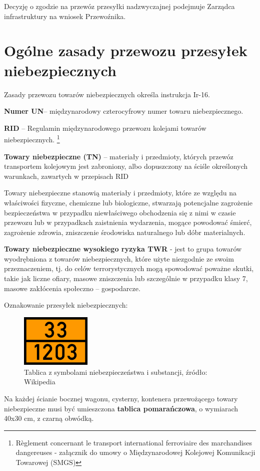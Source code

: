 Decyzję o zgodzie na przewóz przesyłki nadzwyczajnej podejmuje Zarządca infrastruktury na wniosek Przewoźnika.

\chapter{Ogólne zasady przewozu przesyłek niebezpiecznych}

Zasady przewozu towarów niebezpiecznych określa instrukcja Ir-16. 

\textbf{Numer UN}– międzynarodowy czterocyfrowy numer towaru niebezpiecznego.

\textbf{RID} – Regulamin międzynarodowego przewozu kolejami towarów niebezpiecznych.
\footnote{Règlement concernant le transport international ferroviaire des marchandises dangereuses - załącznik do umowy o Międzynarodowej Kolejowej Komunikacji Towarowej (SMGS)}

\textbf{Towary niebezpieczne (TN)} – materiały i przedmioty, których przewóz transportem kolejowym jest zabroniony, albo
dopuszczony na ściśle określonych warunkach, zawartych w przepisach RID

Towary niebezpieczne stanowią materiały i przedmioty, które ze względu na właściwości fizyczne, chemiczne lub biologiczne, stwarzają potencjalne zagrożenie bezpieczeństwa w przypadku niewłaściwego obchodzenia się z nimi w czasie przewozu lub w przypadkach zaistnienia wydarzenia, mogące powodować śmierć, zagrożenie zdrowia, zniszczenie środowiska naturalnego lub dóbr materialnych.

\textbf{Towary niebezpieczne wysokiego ryzyka TWR} -  jest to grupa towarów wyodrębniona z towarów niebezpiecznych, które użyte niezgodnie ze swoim przeznaczeniem, tj. do celów terrorystycznych mogą spowodować poważne skutki, takie jak liczne ofiary, masowe zniszczenia lub szczególnie w przypadku klasy 7, masowe zakłócenia społeczno – gospodarcze.

Oznakowanie przesyłek niebezpiecznych:
\begin{figure}
	\includegraphics[width=0.3\textwidth]{skryptkierownik-img/tablica-adr.png}
	\caption{Tablica z symbolami niebezpieczeństwa i substancji, źródło: Wikipedia}
	\label{fig:adr}
\end{figure}	
Na każdej ścianie bocznej wagonu, cysterny, kontenera przewożącego towary niebezpieczne musi być umieszczona \textbf{tablica pomarańczowa}, o wymiarach 40x30 cm, z czarną obwódką. 

